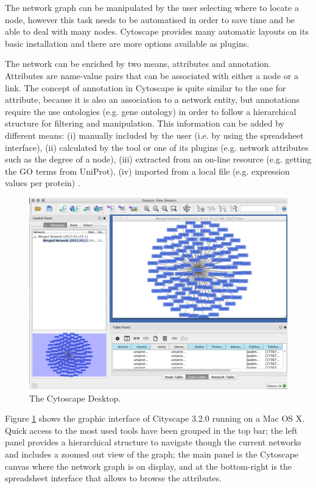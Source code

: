 The network graph can be manipulated by the user selecting where to locate a node, however this task needs to be automatised in order to save time and be able to deal with many nodes. Cytoscape provides many automatic layouts on its basic installation and there are more options available as plugins.

The network can be enriched by two means, attributes and annotation. Attributes are name-value pairs that can be associated with either a node or a link. The concept of annotation in Cytoscape is quite similar to the one for attribute, because it is also an association to a network entity, but annotations require the use ontologies (e.g. gene ontology) in order to follow a hierarchical structure for filtering and manipulation.
This information can be added by different means: (i) manually included by the user (i.e. by using the spreadsheet interface), (ii) calculated by the tool or one of its plugins (e.g. network attributes such as the degree of a node), (iii) extracted from an on-line resource (e.g. getting the GO terms from UniProt), (iv) imported from a local file (e.g. expression values per protein) \cite{SAI2012}.

\begin{figure}  [t]
\centering
\includegraphics[width=\textwidth]{figures/cytoscape.png}
\caption[Cytoscape Snapshot.]{The Cytoscape Desktop.
\label{fig:cytoscape}}
\end{figure}

Figure \ref{fig:cytoscape} shows the graphic interface of Cityscape 3.2.0 running on a Mac OS X. Quick access to the most used tools have been grouped in the top bar; the left panel provides a hierarchical structure to navigate though the current networks and includes a zoomed out view of the graph; the main panel is the Cytoscape canvas where the network graph is on display, and at the bottom-right is the spreadsheet interface that allows to browse the attributes.

